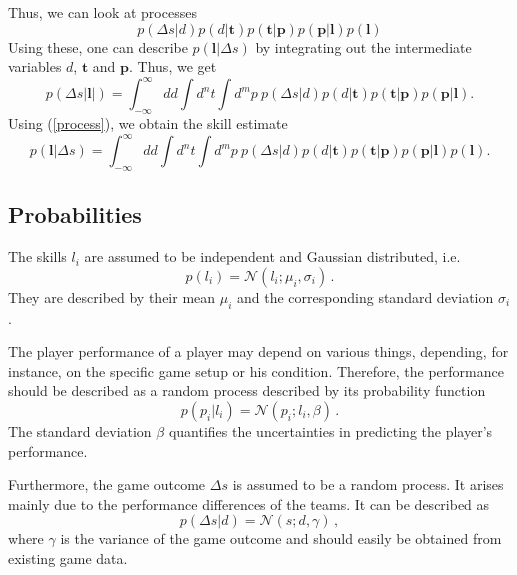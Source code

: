\documentclass{article}
\begin{document}
Thus, we can look at processes
\begin{equation}
p(\Delta s | d) p(d | \mathbf{t} ) p(\mathbf{t} | \mathbf{p} ) p(\mathbf{p} | \mathbf{l}) p(\mathbf{l})
\label{process}
\end{equation}
Using these, one can describe $p(\mathbf{l} | \Delta s)$ by integrating out the intermediate variables $d$, $\mathbf{t}$ and $\mathbf{p}$. Thus, we get
\begin{equation}
p(\Delta s | \mathbf{l} | ) = \int_{-\infty}^{\infty} dd \int d^n t \int d^mp~ p(\Delta s | d) p(d | \mathbf{t} ) p(\mathbf{t} | \mathbf{p} ) p(\mathbf{p} | \mathbf{l}) .
\end{equation}
Using (\ref{process}), we obtain the skill estimate
\begin{equation}
p(\mathbf{l} | \Delta s) = \int_{-\infty}^{\infty} dd \int d^n t \int d^mp~ p(\Delta s | d) p(d | \mathbf{t} ) p(\mathbf{t} | \mathbf{p} ) p(\mathbf{p} | \mathbf{l}) p(\mathbf{l}).
\label{integral}
\end{equation}


\subsection{Probabilities}

The skills $l_i$ are assumed to be independent and Gaussian distributed, i.e.
\begin{equation}
p(l_i) =\mathcal{N}(l_i;\mu_i,\sigma_i) \,.
\end{equation}
They are described by their mean $\mu_i$ and the corresponding standard deviation $\sigma_i$. 

The player performance of a player may depend on various things, depending, for instance, on the specific game setup or his condition. Therefore, the performance should be described as a random process described by its probability function 
\begin{equation}
p(p_i | l_i) = \mathcal{N}(p_i; l_i, \beta)\,.
\end{equation}
The standard deviation $\beta$ quantifies the uncertainties in predicting the player's performance. 

Furthermore, the game outcome $\Delta s$ is assumed to be a random process. It arises mainly due to the performance differences of the teams. It can be described as 
\begin{equation}
p(\Delta s | d ) = \mathcal{N}(s; d, \gamma)\, ,
\end{equation}
where $\gamma$ is the variance of the game outcome and should easily be obtained from existing game data. 
\end{document}
